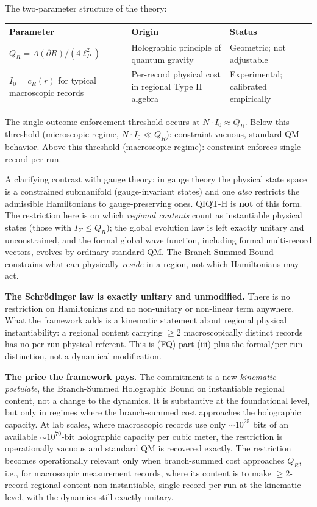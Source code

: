 \documentclass[11pt,a4paper]{article}
\begin{document}
The two-parameter structure of the theory:
\begin{center}
\small
\begin{tabularx}{\linewidth}{|Y|Y|Y|}
\hline
\textbf{Parameter} & \textbf{Origin} & \textbf{Status} \\
\hline
$Q_R = A(\partial R)/(4\ell_P^2)$ & Holographic principle of quantum gravity & Geometric; not adjustable \\
\hline
$I_0 = c_R(r)$ for typical macroscopic records & Per-record physical cost in regional Type II algebra & Experimental; calibrated empirically \\
\hline
\end{tabularx}
\end{center}

The single-outcome enforcement threshold occurs at $N \cdot I_0 \approx Q_R$. Below this threshold (microscopic regime, $N \cdot I_0 \ll Q_R$): constraint vacuous, standard QM behavior. Above this threshold (macroscopic regime): constraint enforces single-record per run.

A clarifying contrast with gauge theory: in gauge theory the physical state space is a constrained submanifold (gauge-invariant states) and one \emph{also} restricts the admissible Hamiltonians to gauge-preserving ones. QIQT-H is \textbf{not} of this form. The restriction here is on which \emph{regional contents} count as instantiable physical states (those with $I_\Sigma \le Q_R$); the global evolution law is left exactly unitary and unconstrained, and the formal global wave function, including formal multi-record vectors, evolves by ordinary standard QM. The Branch-Summed Bound constrains what can physically \emph{reside} in a region, not which Hamiltonians may act.

\textbf{The Schrödinger law is exactly unitary and unmodified.} There is no restriction on Hamiltonians and no non-unitary or non-linear term anywhere. What the framework adds is a kinematic statement about regional physical instantiability: a regional content carrying $\ge 2$ macroscopically distinct records has no per-run physical referent. This is (FQ) part (iii) plus the formal/per-run distinction, not a dynamical modification.

\textbf{The price the framework pays.} The commitment is a new \emph{kinematic postulate}, the Branch-Summed Holographic Bound on instantiable regional content, not a change to the dynamics. It is substantive at the foundational level, but only in regimes where the branch-summed cost approaches the holographic capacity. At lab scales, where macroscopic records use only $\sim 10^{25}$ bits of an available $\sim 10^{70}$-bit holographic capacity per cubic meter, the restriction is operationally vacuous and standard QM is recovered exactly. The restriction becomes operationally relevant only when branch-summed cost approaches $Q_R$, i.e., for macroscopic measurement records, where its content is to make $\ge 2$-record regional content non-instantiable, single-record per run at the kinematic level, with the dynamics still exactly unitary.
\end{document}
